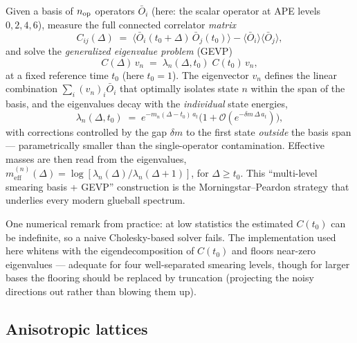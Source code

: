 \documentclass[11pt,a4paper]{article}
\newcommand{\Obar}{\bar{O}}
\newcommand{\meff}{m_{\mathrm{eff}}}
\newcommand{\at}{a_t}
\begin{document}
Given a basis of $n_{\rm op}$ operators $\Obar_i$ (here: the scalar operator
at APE levels $0,2,4,6$), measure the full connected correlator
\emph{matrix}
\begin{equation}
  C_{ij}(\Delta) \;=\;
  \big\langle \Obar_i(t_0{+}\Delta)\, \Obar_j(t_0) \big\rangle
  - \langle\Obar_i\rangle \langle\Obar_j\rangle ,
\end{equation}
and solve the \emph{generalized eigenvalue problem} (GEVP)
\cite{MichaelTeasdale1983,LuscherWolff1990,Blossier2009}
\begin{equation}
  C(\Delta)\, v_n \;=\; \lambda_n(\Delta, t_0)\; C(t_0)\, v_n ,
  \label{eq:gevp}
\end{equation}
at a fixed reference time $t_0$ (here $t_0=1$). The eigenvector $v_n$ defines
the linear combination $\sum_i (v_n)_i \Obar_i$ that optimally isolates state
$n$ within the span of the basis, and the eigenvalues decay with the
\emph{individual} state energies,
\begin{equation}
  \lambda_n(\Delta,t_0) \;=\; e^{-m_n (\Delta-t_0)\,\at}
  \big( 1 + \mathcal{O}(e^{-\delta m\, \Delta \,\at}) \big),
\end{equation}
with corrections controlled by the gap $\delta m$ to the first state
\emph{outside} the basis span --- parametrically smaller than the
single-operator contamination. Effective masses are then read from the
eigenvalues, $\meff^{(n)}(\Delta)=\log[\lambda_n(\Delta)/\lambda_n(\Delta+1)]$,
for $\Delta\ge t_0$. This ``multi-level smearing basis + GEVP'' construction
is the Morningstar--Peardon strategy \cite{MorningstarPeardon1999} that
underlies every modern glueball spectrum.

One numerical remark from practice: at low statistics the estimated $C(t_0)$
can be indefinite, so a naive Cholesky-based solver fails. The implementation
used here whitens with the eigendecomposition of $C(t_0)$ and floors
near-zero eigenvalues --- adequate for four well-separated smearing levels,
though for larger bases the flooring should be replaced by truncation
(projecting the noisy directions out rather than blowing them up).

\subsection{Anisotropic lattices}
\label{sec:aniso}
\end{document}
